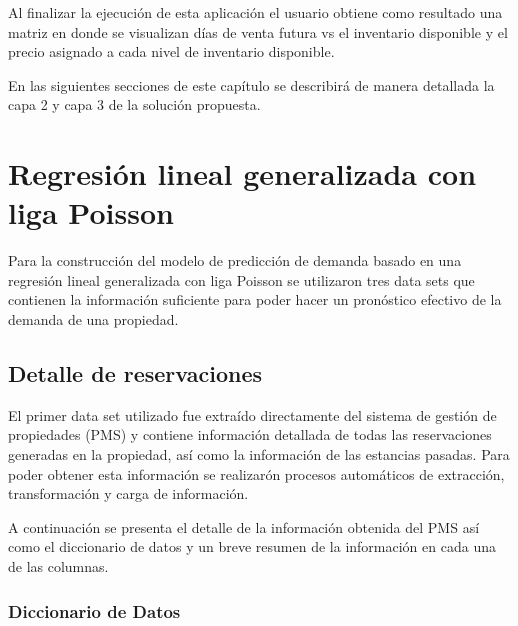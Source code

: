 Al finalizar la ejecución de esta aplicación el usuario obtiene como resultado una matriz en donde se visualizan días de venta futura vs el inventario disponible y el precio asignado a cada nivel de inventario disponible. 

En las siguientes secciones de este capítulo se describirá de manera detallada la capa 2 y capa 3 de la solución propuesta.

\section*{Regresión lineal generalizada con liga Poisson}

Para la construcción del modelo de predicción de demanda basado en una regresión lineal generalizada con liga Poisson se utilizaron tres data sets que contienen la información suficiente para poder hacer un pronóstico efectivo de la demanda de una propiedad.

\subsection*{Detalle de reservaciones}


El primer data set utilizado fue extraído directamente del sistema de gestión de propiedades (PMS) y contiene información detallada de todas las reservaciones generadas en la propiedad, así como la información de las estancias pasadas. Para poder obtener esta información se realizarón procesos automáticos de extracción, transformación y carga de información. 

A continuación se presenta el detalle de la información obtenida del PMS así como el diccionario de datos y un breve resumen de la información en cada una de las columnas.

\subsubsection*{Diccionario de Datos}


